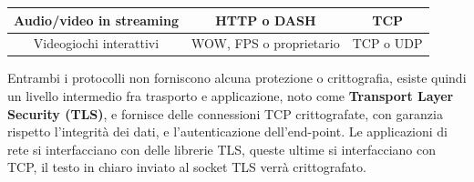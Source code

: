 \documentclass[12pt, letterpaper]{article}
\begin{document}
\begin{center}
\begin{tabular}{|c|c|c|}
        Audio/video in streaming & HTTP o DASH                                                                          & TCP                                                                                  \\ \hline
        \rowcolor[HTML]{EFEFEF}
        Videogiochi interattivi  & WOW, FPS o proprietario                                                              & \cellcolor[HTML]{EFEFEF}TCP o UDP                                                    \\ \hline
    \end{tabular}
\end{center}
Entrambi i protocolli non forniscono alcuna protezione o crittografia, esiste quindi un livello
intermedio fra trasporto e applicazione, noto come \textbf{Transport Layer Security (TLS)}, e fornisce
delle connessioni TCP crittografate, con garanzia rispetto l'integrità dei dati, e l'autenticazione
dell'end-point. Le applicazioni di rete si interfacciano con delle librerie TLS, queste ultime si
interfacciano con TCP, il testo in chiaro inviato al socket TLS verrà crittografato.
\end{document}
